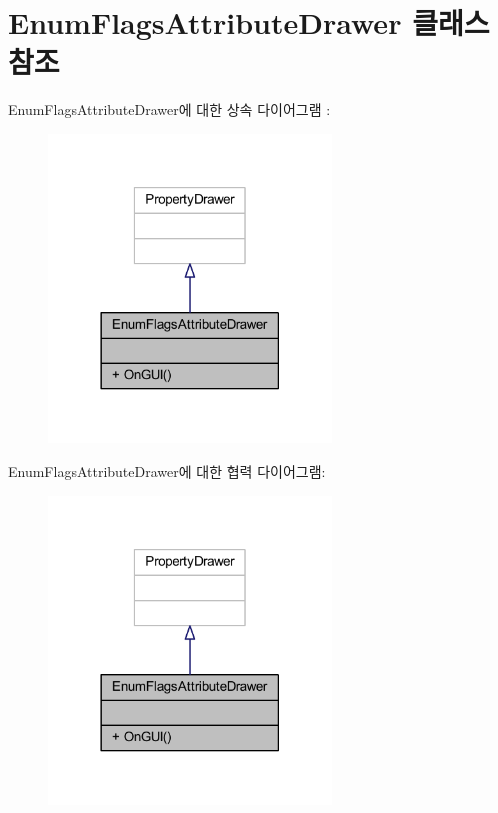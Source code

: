 \hypertarget{class_enum_flags_attribute_drawer}{}\section{Enum\+Flags\+Attribute\+Drawer 클래스 참조}
\label{class_enum_flags_attribute_drawer}


Enum\+Flags\+Attribute\+Drawer에 대한 상속 다이어그램 \+: \nopagebreak
\begin{figure}[H]
\begin{center}
\leavevmode
\includegraphics[width=213pt]{d9/d54/class_enum_flags_attribute_drawer__inherit__graph}
\end{center}
\end{figure}


Enum\+Flags\+Attribute\+Drawer에 대한 협력 다이어그램\+:\nopagebreak
\begin{figure}[H]
\begin{center}
\leavevmode
\includegraphics[width=213pt]{d5/dc5/class_enum_flags_attribute_drawer__coll__graph}
\end{center}
\end{figure}
